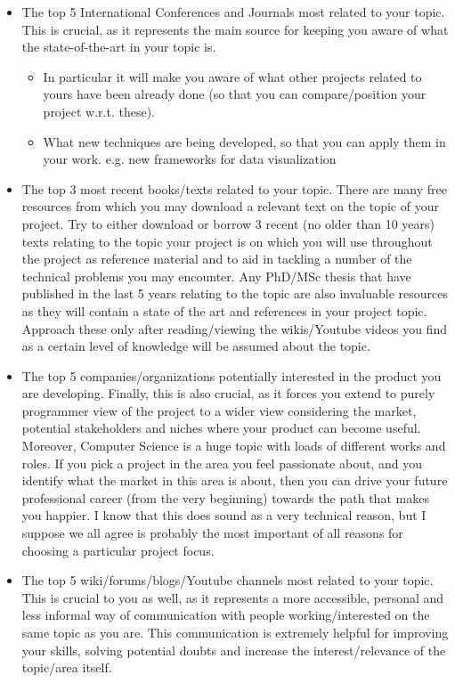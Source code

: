 \begin{itemize}
    \item The top 5 International Conferences and Journals most related to your topic. This is crucial, as it represents the main source for keeping you aware of what the state-of-the-art in your topic is.
    \begin{itemize}
        \item In particular it will make you aware of what other projects related to yours have been already done (so that you can compare/position your project w.r.t. these).
        \item What new techniques are being developed, so that you can apply them in your work. e.g. new frameworks for data visualization
    \end{itemize}
    \item The top 3 most recent books/texts related to your topic. There are many free resources from which you may download a relevant text on the topic of your project. Try to either download or borrow 3 recent (no older than 10 years) texts relating to the topic your project is on which you will use throughout the project as reference material and to aid in tackling a number of the technical problems you may encounter. Any PhD/MSc thesis that have published in the last 5 years relating to the topic are also invaluable resources as they will contain a state of the art and references in your project topic. Approach these only after reading/viewing the wikis/Youtube videos you find as a certain level of knowledge will be assumed about the topic.
    \item The top 5 companies/organizations potentially interested in the product you are developing. Finally, this is also crucial, as it forces you extend to purely programmer view of the project to a wider view considering the market, potential stakeholders and niches where your product can become useful. Moreover, Computer Science is a huge topic with loads of different works and roles. If you pick a project in the area you feel passionate about, and you identify what the market in this area is about, then you can drive your future professional career (from the very beginning) towards the path that makes you happier. I know that this does sound as a very technical reason, but I suppose we all agree is probably the most important of all reasons for choosing a particular project focus. 
    \item The top 5 wiki/forums/blogs/Youtube channels most related to your topic. This is crucial to you as well, as it represents a more accessible, personal and less informal way of communication with people working/interested on the same topic as you are. This communication is extremely helpful for improving your skills, solving potential doubts and increase the interest/relevance of the topic/area itself.
\end{itemize}

